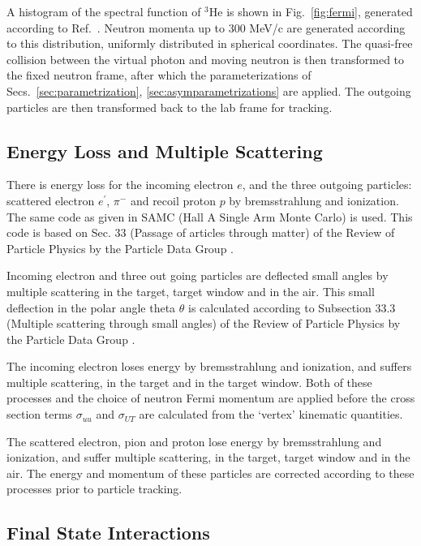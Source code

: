 A histogram of the spectral function of $^3$He is shown in
Fig.~\ref{fig:fermi}, generated according to Ref.~\cite{fermipaper}. Neutron
momenta up to 300 MeV/c are generated according to this distribution, uniformly
distributed in spherical coordinates. The quasi-free collision between the
virtual photon and moving neutron is then transformed to the fixed neutron
frame, after which the parameterizations of Secs.~\ref{sec:parametrization},
\ref{sec:asymparametrizations} are applied. The outgoing particles are then
transformed back to the lab frame for tracking.

\subsection{Energy Loss and Multiple Scattering
\label{sec:energyloss}}

There is energy loss for the incoming electron $e$, and the three outgoing
particles: scattered electron $e^{\prime}$, $\pi^{-}$ and recoil proton $p$ by
bremsstrahlung and ionization.  The same code as given in SAMC (Hall A Single
Arm Monte Carlo) \cite{samc} is used.  This code is based on Sec. 33 (Passage
of articles through matter) of the Review of Particle Physics by the Particle
Data Group \cite{pdg}.

Incoming electron and three out going particles are deflected small angles by
multiple scattering in the target, target window and in the air. This small
deflection in the polar angle theta $\theta$ is calculated according to
Subsection 33.3 (Multiple scattering through small angles) of the Review of Particle
Physics by the Particle Data Group \cite{pdg}.

The incoming electron loses energy by bremsstrahlung and ionization, and
suffers multiple scattering, in the target and in the target window.  Both of
these processes and the choice of neutron Fermi momentum are applied before the
cross section terms $\sigma_{uu}$ and $\sigma_{UT}$ are calculated from the
`vertex' kinematic quantities.

The scattered electron, pion and proton lose energy by bremsstrahlung and
ionization, and suffer multiple scattering, in the target, target window and in
the air.  The energy and momentum of these particles are corrected according to
these processes prior to particle tracking.

\subsection{Final State Interactions
\label{sec:fsi}}

